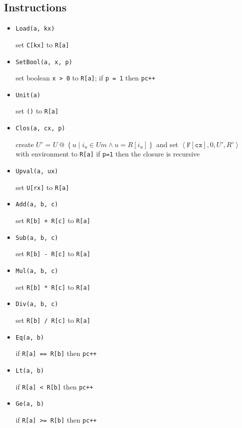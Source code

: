 \documentclass{article}
\begin{document}
\subsection{Instructions}
\begin{minipage}{\textwidth}
    \begin{multicols}{2}
        \begin{itemize}
            \item \texttt{Load(a, kx)}

                set \texttt{C[kx]} to \texttt{R[a]}
            \item \texttt{SetBool(a, x, p)}

                set boolean \texttt{x > 0} to \texttt{R[a]};
                if \texttt{p = 1} then \texttt{pc++}
            \item \texttt{Unit(a)}

                set \texttt{()} to \texttt{R[a]}
            \item \texttt{Clos(a, cx, p)}

                create $U'$ = $U\ @\ \left\{u \mid i_u \in \mathit{Um} \wedge u = R[i_u]\right\}$
                and set $\left\langle \mathtt{F[cx]}, 0, U', R'\right\rangle$ with environment to \texttt{R[a]}
                if \texttt{p=1} then the closure is recursive
            \item \texttt{Upval(a, ux)}

                set \texttt{U[rx]} to \texttt{R[a]}
            \item \texttt{Add(a, b, c)}

                set \texttt{R[b] + R[c]} to \texttt{R[a]}
            \item \texttt{Sub(a, b, c)}

                set \texttt{R[b] - R[c]} to \texttt{R[a]}
            \item \texttt{Mul(a, b, c)}

                set \texttt{R[b] * R[c]} to \texttt{R[a]}
            \item \texttt{Div(a, b, c)}

                set \texttt{R[b] / R[c]} to \texttt{R[a]}
            \item \texttt{Eq(a, b)}

                if \texttt{R[a] == R[b]} then \texttt{pc++}
            \item \texttt{Lt(a, b)}

                if \texttt{R[a] < R[b]} then \texttt{pc++}
            \item \texttt{Ge(a, b)}

                if \texttt{R[a] >= R[b]} then \texttt{pc++}
        \end{itemize}
    \end{multicols}
\end{minipage}
\end{document}
